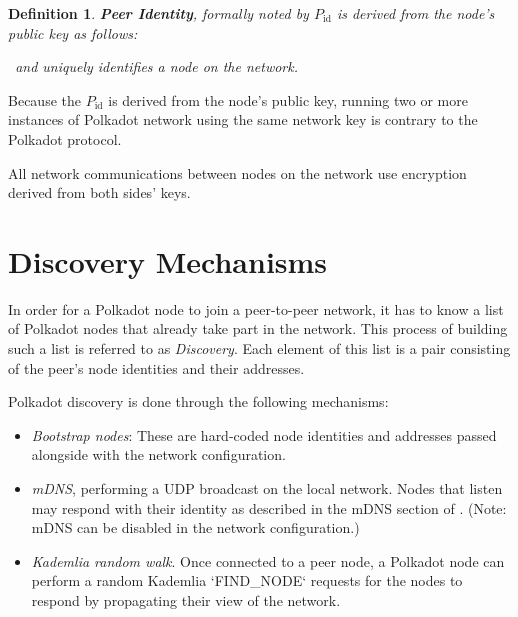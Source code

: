\documentclass{book}
\newcommand{\tmem}[1]{{\em #1\/}}
\newcommand{\tmop}[1]{\ensuremath{\operatorname{#1}}}
\newcommand{\tmstrong}[1]{\textbf{#1}}
\newcommand{\tmtextbf}[1]{{\bfseries{#1}}}
\newcommand{\tmtextit}[1]{{\itshape{#1}}}
\newtheorem{definition}{Definition}
\providecommand{\tmem}[1]{\tmtextit{#1}}
\providecommand{\tmop}[1]{\ensuremath{\mathrm{#1}}}
\providecommand{\tmstrong}[1]{\tmtextbf{#1}}
\providecommand{\tmtextbf}[1]{\tmtextbf{#1}}
\providecommand{\tmtextit}[1]{\tmtextit{#1}}
\newtheorem{definition}{Definition}
\begin{document}
{}

\begin{definition}
  {\tmstrong{Peer Identity}}, formally noted by $P_{\tmop{id}}$ is derived
  from the node's public key as follows:
  
  {\todo{SPEC: How to derive $P_{\tmop{id}}$}} \ and uniquely identifies a
  node on the network.
\end{definition}

Because the $P_{\tmop{id}}$ is derived from the node's public key, running two
or more instances of Polkadot network using the same network key is contrary
to the Polkadot protocol.

All network communications between nodes on the network use encryption derived
from both sides' keys.

{}

\section{Discovery Mechanisms}

In order for a Polkadot node to join a peer-to-peer network, it has to know a
list of Polkadot nodes that already take part in the network. This process of
building such a list is referred to as {\tmem{Discovery}}. Each element of
this list is a pair consisting of the peer's node identities and their
addresses.

{}

Polkadot discovery is done through the following mechanisms:
\begin{itemize}
  \item {\tmem{Bootstrap nodes}}: These are hard-coded node identities and
  addresses passed alongside with the network configuration.
  
  \item {\tmem{mDNS}}, performing a UDP broadcast on the local network. Nodes
  that listen may respond with their identity as described in the mDNS section
  of {\cite{protocol_labs_libp2p_2019}}. (Note: mDNS can be disabled in the
  network configuration.)
  
  \item {\tmem{Kademlia random walk}}. Once connected to a peer node, a
  Polkadot node can perform a random Kademlia `FIND\_NODE` requests for the
  nodes {} to respond by propagating their view of the
  network.
\end{itemize}
\end{document}
